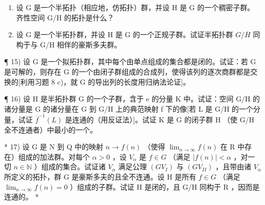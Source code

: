 \begin{enumerate}
\def\labelenumi{\arabic{enumi})}
\setcounter{enumi}{12}
\item
  设 G 是一个半拓扑（相应地，仿拓扑）群，并设 H 是 G 的一个稠密子群。齐性空间 G/H 的拓扑是什么？
\item
  设 G 是一个半拓扑群，并设 H 是 G 的一个正规子群。试证半拓扑群 \(G/\overline{H}\) 同构于与 G/H 相伴的豪斯多夫群。
\end{enumerate}

¶ 15) 设 G 是一个拟拓扑群，其中每个由单点组成的集合都是闭的。试证：若 G 是可解的，则存在 G 的一个由闭子群组成的合成列，使得该列的逐次商群都是交换的{[}利用习题 8 c)，就 G 的导出列的长度用归纳法论证{]}。

¶ 16) 设 H 是半拓扑群 G 的一个子群，含于 e 的分量 K 中。试证：空间 G/H 的诸分量是 G 的诸分量在 G 到 G/H 上的典范映射 f 下的像{[}若 L 是 G/H 的一个分量，试证 \(\overline{f}^{-1}(L)\) 是连通的（用反证法）{]}。试证 K 是 G 的闭子群 H （使 G/H 全不连通者）中最小的一个。

* 17) 设 G 是 N 到 Q 中的映射 \(n \to f(n)\) （使得 \(\lim_{n \to \infty} f(n)\) 在 R 中存在）组成的加法群。对每个 \(\alpha > 0\) ，设 \(V_{\alpha}\) 是 \(f \in G\) （满足 \(|f(n)| < \alpha\) ，对一切 \(n \in \mathbb{N}\) ）组成的集合。试证诸 \(V_{\alpha}\) 满足公理 \((GV_{I})\) 与 \((GV_{II})\) ，且带由诸 \(V_{\alpha}\) 所定义的拓扑，群 G 是豪斯多夫的且全不连通。设 H 是所有 \(f \in G\) （满足 \(\lim_{n \to \infty} f(n) = 0\) ）组成的子群。试证 H 是闭的，且 G/H 同构于 R ，因而是连通的。 *

